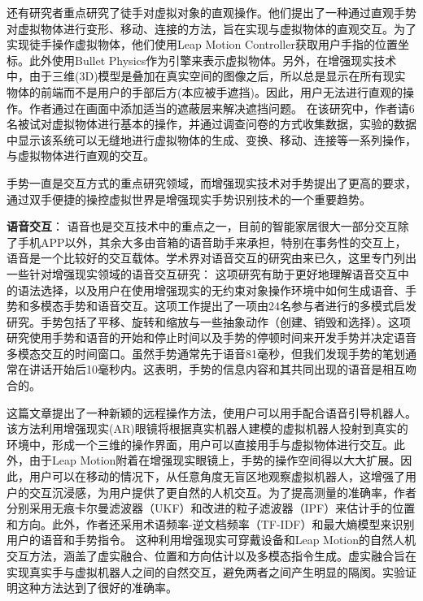 还有研究者\cite{SakIshHor20}重点研究了徒手对虚拟对象的直观操作。他们提出了一种通过直观手势对虚拟物体进行变形、移动、连接的方法，旨在实现与虚拟物体的直观交互。为了实现徒手操作虚拟物体，他们使用Leap Motion Controller\cite{ultraleap}获取用户手指的位置坐标。此外使用Bullet Physics\cite{BulletPhysics}作为引擎来表示虚拟物体。另外，在增强现实技术中，由于三维(3D)模型是叠加在真实空间的图像之后，所以总是显示在所有现实物体的前端而不是用户的手部后方(本应被手遮挡)。因此，用户无法进行直观的操作。作者通过在画面中添加适当的遮蔽层来解决遮挡问题。
在该研究中，作者请6名被试对虚拟物体进行基本的操作，并通过调查问卷的方式收集数据，实验的数据中显示该系统可以无缝地进行虚拟物体的生成、变换、移动、连接等一系列操作，与虚拟物体进行直观的交互。

手势一直是交互方式的重点研究领域，而增强现实技术对手势提出了更高的要求，通过双手便捷的操控虚拟世界是增强现实手势识别技术的一个重要趋势。

\textbf{语音交互}：
语音也是交互技术中的重点之一，目前的智能家居很大一部分交互除了手机APP以外，其余大多由音箱的语音助手来承担，特别在事务性的交互上，语音是一个比较好的交互载体。学术界对语音交互的研究由来已久，这里专门列出一些针对增强现实领域的语音交互研究：
这项研究\cite{WilOrt20}有助于更好地理解语音交互中的语法选择，以及用户在使用增强现实的无约束对象操作环境中如何生成语音、手势和多模态手势和语音交互。这项工作提出了一项由24名参与者进行的多模式启发研究。手势包括了平移、旋转和缩放与一些抽象动作（创建、销毁和选择）。这项研究使用手势和语音的开始和停止时间以及手势的停顿时间来开发手势并决定语音多模态交互的时间窗口。虽然手势通常先于语音81毫秒，但我们发现手势的笔划通常在讲话开始后10毫秒内。这表明，手势的信息内容和其共同出现的语音是相互吻合的。

这篇文章\cite{DuZhaLi19}提出了一种新颖的远程操作方法，使用户可以用手配合语音引导机器人。
该方法利用增强现实(AR)眼镜将根据真实机器人建模的虚拟机器人投射到真实的环境中，形成一个三维的操作界面，用户可以直接用手与虚拟物体进行交互。此外，由于Leap Motion附着在增强现实眼镜上，手势的操作空间得以大大扩展。因此，用户可以在移动的情况下，从任意角度无盲区地观察虚拟机器人，这增强了用户的交互沉浸感，为用户提供了更自然的人机交互。为了提高测量的准确率，作者分别采用无痕卡尔曼滤波器（UKF）和改进的粒子滤波器（IPF）来估计手的位置和方向。此外，作者还采用术语频率-逆文档频率（TF-IDF）和最大熵模型来识别用户的语音和手势指令。
这种利用增强现实可穿戴设备和Leap Motion的自然人机交互方法，涵盖了虚实融合、位置和方向估计以及多模态指令生成。虚实融合旨在实现真实手与虚拟机器人之间的自然交互，避免两者之间产生明显的隔阂。实验证明这种方法达到了很好的准确率。


